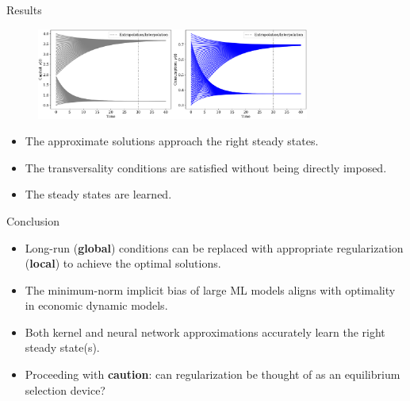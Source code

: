 \documentclass[aspectratio=169,10pt]{beamer}
\newcommand{\emphcolor}[1]{\textbf{\textcolor{emphcolorval}{#1}}}
\begin{document}
\begin{frame}{Results}
	\label{butterfly}
	\begin{figure}[t!]
		\centering
		\includegraphics[width=0.8\textwidth]{figs/neoclassical_growth_model_concave_convex_threshold.pdf}
		\vspace{-4mm}
	\end{figure}
	\begin{itemize}
		\item The approximate solutions approach the right steady states.
		\vspace{0.1in}
		\item The transversality conditions are satisfied without being directly imposed.
		\vspace{0.1in}
		\item The steady states are learned. 
		\hyperlink{DAE}{}
	\end{itemize}
\end{frame}

\begin{frame}{Conclusion}
	\begin{itemize}
		\item Long-run (\emphcolor{global}) conditions can be replaced with appropriate regularization (\emphcolor{local}) to achieve the optimal solutions.
		\vspace{0.1in}
		\item The minimum-norm implicit bias of large ML models aligns with optimality in economic dynamic models.
		\vspace{0.1in}
		\item Both kernel and neural network approximations accurately learn the right steady state(s).
		\vspace{0.1in}
		\item Proceeding with \emphcolor{caution}: can regularization be thought of as an equilibrium selection device?
	\end{itemize}
\end{frame}
\end{document}
